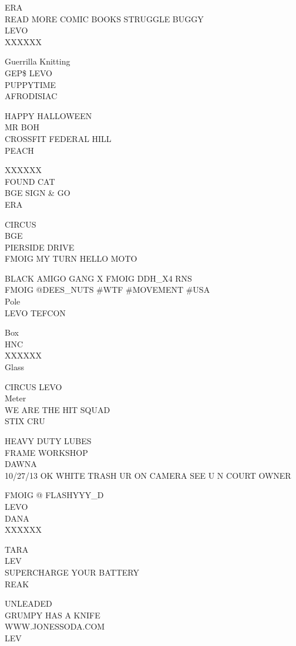 \documentclass[10pt,letterpaper]{article}
\begin{document}
ERA\\
READ MORE COMIC BOOKS STRUGGLE BUGGY\\
LEVO\\
XXXXXX

Guerrilla Knitting\\
GEP\$ LEVO\\
PUPPYTIME\\
AFRODISIAC

HAPPY HALLOWEEN\\
MR BOH\\
CROSSFIT FEDERAL HILL\\
PEACH

XXXXXX\\
FOUND CAT\\
BGE SIGN \& GO\\
ERA

CIRCUS\\
BGE\\
PIERSIDE DRIVE\\
FMOIG MY TURN HELLO MOTO

BLACK AMIGO GANG X FMOIG DDH\_X4 RNS\\
FMOIG @DEES\_NUTS \#WTF \#MOVEMENT \#USA\\
Pole\\
LEVO TEFCON

Box\\
HNC\\
XXXXXX\\
Glass

CIRCUS LEVO\\
Meter\\
WE ARE THE HIT SQUAD\\
STIX CRU

HEAVY DUTY LUBES\\
FRAME WORKSHOP\\
DAWNA\\
10/27/13 OK WHITE TRASH UR ON CAMERA SEE U N COURT OWNER

FMOIG @ FLASHYYY\_D\\
LEVO\\
DANA\\
XXXXXX

TARA\\
LEV\\
SUPERCHARGE YOUR BATTERY\\
REAK

UNLEADED\\
GRUMPY HAS A KNIFE\\
WWW.JONESSODA.COM\\
LEV
\end{document}

